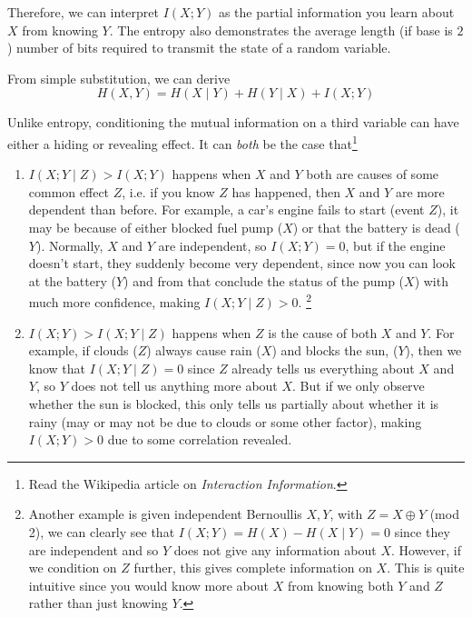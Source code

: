 \documentclass{article}
\begin{document}
    Therefore, we can interpret $I(X; Y)$ as the partial information you learn about $X$ from knowing $Y$. The entropy also demonstrates the average length (if base is $2$) number of bits required to transmit the state of a random variable. 

    \begin{theorem}
      From simple substitution, we can derive 
      \begin{equation}
        H(X, Y) = H(X \mid Y) + H(Y \mid X) + I(X; Y)
      \end{equation}
    \end{theorem}

    Unlike entropy, conditioning the mutual information on a third variable can have either a hiding or revealing effect. It can \textit{both} be the case that\footnote{Read the Wikipedia article on \textit{Interaction Information}.}
    \begin{enumerate}
      \item $I(X; Y \mid Z) > I(X; Y)$ happens when $X$ and $Y$ both are causes of some common effect $Z$, i.e. if you know $Z$ has happened, then $X$ and $Y$ are more dependent than before. For example, a car's engine fails to start (event $Z$), it may be because of either blocked fuel pump ($X$) or that the battery is dead ($Y$). Normally, $X$ and $Y$ are independent, so $I(X; Y) = 0$, but if the engine doesn't start, they suddenly become very dependent, since now you can look at the battery ($Y$) and from that conclude the status of the pump ($X$) with much more confidence, making $I(X; Y \mid Z) > 0$. \footnote{Another example is given independent Bernoullis $X, Y$, with $Z = X \oplus Y$ (mod 2), we can clearly see that $I(X; Y) = H(X) - H(X \mid Y) = 0$ since they are independent and so $Y$ does not give any information about $X$. However, if we condition on $Z$ further, this gives complete information on $X$. This is quite intuitive since you would know more about $X$ from knowing both $Y$ and $Z$ rather than just knowing $Y$.}

      \item $I(X; Y) > I(X; Y \mid Z)$ happens when $Z$ is the cause of both $X$ and $Y$. For example, if clouds ($Z$) always cause rain ($X$) and blocks the sun, ($Y$), then we know that $I(X; Y \mid Z) = 0$ since $Z$ already tells us everything about $X$ and $Y$, so $Y$ does not tell us anything more about $X$. But if we only observe whether the sun is blocked, this only tells us partially about whether it is rainy (may or may not be due to clouds or some other factor), making $I(X; Y) > 0$ due to some correlation revealed.   
    \end{enumerate}
\end{document}
